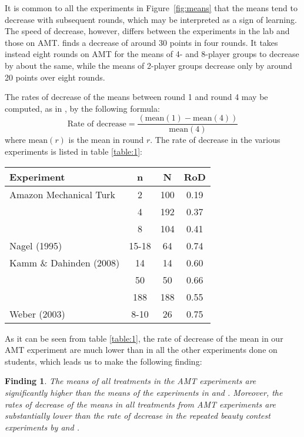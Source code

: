 \documentclass[12pt,review]{elsarticle}
\newtheorem{fdn}{Finding}
\begin{document}
It is common to all the experiments in Figure~\ref{fig:means} that the means tend to decrease with subsequent rounds, which may be interpreted as a sign of learning. The speed of decrease, however, differs between
the experiments in the lab and those on AMT. \citet{Nagel95} finds a decrease of around 30 points in four rounds. It takes instead eight rounds on AMT for the means of 4- and 8-player groups to decrease by about the same, while the means of 2-player groups decrease only by around 20 points over eight rounds.

The rates of decrease of the means between round 1 and round 4 may be computed, as in \citet{Nagel95}, by the following formula:
\[
\text{Rate of decrease}=\frac{(\text{mean}(1)-\text{mean}(4))}{\text{mean}(4)}
\]
where $\text{mean}(r)$ is the mean in round $r$. The rate of decrease in the various experiments is listed in table \ref{table:1}:

\begin{SCtable}
\begin{tabular}{lccc}
\hline
Experiment   &  n 		&  N 	&  RoD \\
\hline
Amazon Mechanical Turk   & 2 		& 100 	& 0.19 \\
	   & 4 		& 192 	& 0.37 \\
	   & 8 		& 104 	& 0.41 \\
Nagel (1995)    & 15-18 	& 64  	& 0.74  \\
Kamm \& Dahinden (2008)  & 14 		& 14 	& 0.60  \\
	   & 50 		& 50 	& 0.66  \\
	   & 188 		& 188 	& 0.55  \\
Weber (2003)   & 8-10	& 26	& 0.75  \\
\hline
\end{tabular}
\caption{Rates of decrease in iterated p-beauty contest experiments with $p=2/3$. n = group size; N = number of subjects; RoD = rate of decrease from round 1 to round 4.}
\label{table:1}
\end{SCtable}

As it can be seen from table \ref{table:1}, the rate of decrease of the mean in our AMT experiment are much lower than in all the other experiments done on students, which leads us to make the following finding:


\begin{fdn}
The means of all treatments in the AMT experiments are significantly higher than the means of the experiments in \citet{Nagel95, Kamm2008unter} and \citet{weber2003learning}. Moreover, the rates of decrease of the means in all treatments from AMT experiments are substantially lower than the rate of decrease in the repeated beauty contest experiments by \citet{Nagel95, Kamm2008unter} and \citet{weber2003learning}.
\end{fdn}
\end{document}
